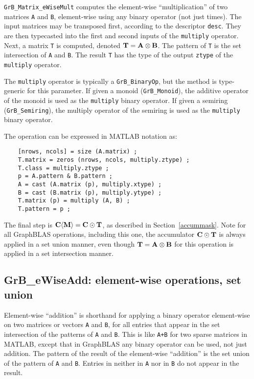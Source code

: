 \documentclass[12pt]{article}
\begin{document}
\verb'GrB_Matrix_eWiseMult' computes the element-wise ``multiplication'' of two
matrices \verb'A' and \verb'B', element-wise using any binary operator (not
just times).  The input matrices may be transposed first, according to the
descriptor \verb'desc'.  They are then typecasted into the first and second
inputs of the \verb'multiply' operator.  Next, a matrix \verb'T' is computed,
denoted ${\bf T = A \otimes B}$.  The pattern of \verb'T' is the set
intersection of \verb'A' and \verb'B'.  The result \verb'T' has the type of the
output \verb'ztype' of the \verb'multiply' operator.

The \verb'multiply' operator is typically a \verb'GrB_BinaryOp', but the method
is type-generic for this parameter.  If given a monoid (\verb'GrB_Monoid'), the
additive operator of the monoid is used as the \verb'multiply' binary operator.
If given a semiring (\verb'GrB_Semiring'), the multiply operator of the
semiring is used as the \verb'multiply' binary operator.

\vspace{0.05in}
The operation can be expressed in MATLAB notation as:
    {\footnotesize
    \begin{verbatim}
    [nrows, ncols] = size (A.matrix) ;
    T.matrix = zeros (nrows, ncols, multiply.ztype) ;
    T.class = multiply.ztype ;
    p = A.pattern & B.pattern ;
    A = cast (A.matrix (p), multiply.xtype) ;
    B = cast (B.matrix (p), multiply.ytype) ;
    T.matrix (p) = multiply (A, B) ;
    T.pattern = p ; \end{verbatim} }

The final step is ${\bf C \langle M \rangle  = C \odot T}$, as described in
Section~\ref{accummask}.  Note for all GraphBLAS operations, including this
one, the accumulator ${\bf C \odot T}$ is always applied in a set union manner,
even though ${\bf T = A \otimes B}$ for this operation is applied in a set
intersection manner.

\newpage
\subsection{{\sf GrB\_eWiseAdd:} element-wise operations, set union} %
\label{eWiseAdd}

Element-wise ``addition'' is shorthand for applying a binary operator
element-wise on two matrices or vectors \verb'A' and \verb'B', for all entries
that appear in the set intersection of the patterns of \verb'A' and \verb'B'.
This is like \verb'A+B' for two sparse matrices in MATLAB, except that in
GraphBLAS any binary operator can be used, not just addition.  The pattern of
the result of the element-wise ``addition'' is the set union of the pattern of
\verb'A' and \verb'B'.  Entries in neither in \verb'A' nor in \verb'B' do
not appear in the result.
\end{document}
